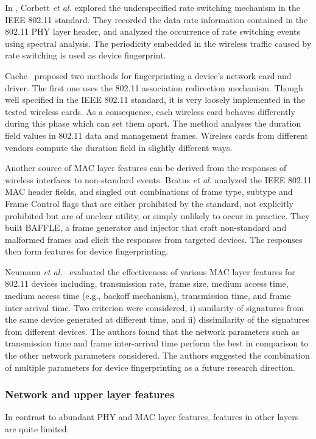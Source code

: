 \documentclass[journal,draftcls,onecolumn,11pt]{IEEEtran}
\newcounter{ctr}\setcounter{ctr}{0}
\begin{document}
In \cite{Corbett2008}, Corbett {\it et al.} explored the underspecified rate switching mechanism in the IEEE 802.11 standard. They recorded the data rate information contained in the 802.11 PHY layer header, and analyzed the occurrence of rate switching events using spectral analysis. The periodicity embedded in the wireless traffic caused by rate switching is used as device fingerprint.

Cache~\cite{Cache} proposed two methods for fingerprinting a device’s network card and driver. The first one uses the 802.11 association redirection mechanism.  Though well specified in the IEEE 802.11 standard, it is very loosely implemented in the tested wireless cards. As a consequence, each wireless card behaves differently during this phase which can set them apart.  The method analyses the duration field values in 802.11 data and management frames.  Wireless cards from different vendors compute the duration field in slightly different ways.

Another source of MAC layer features can be derived from the responses of wireless interfaces to non-standard events. Bratus {\it et al.}\cite{Bratus2008} analyzed the IEEE 802.11 MAC header fields, and singled out combinations of frame type, subtype and Frame Control flags that are either prohibited by the standard, not explicitly prohibited but are of unclear utility, or simply unlikely to occur in practice. They built BAFFLE, a frame generator and injector that craft non-standard and malformed frames and elicit the responses from targeted devices. The responses then form features for device fingerprinting.

Neumann {\it et al.}~\cite{Neumann} evaluated the effectiveness of various MAC layer features for 802.11 devices including, transmission rate, frame size, medium access time, medium access time (e.g., backoff mechanism), transmission time, and frame inter-arrival time. Two criterion were considered, i) similarity of signatures from the same device generated at different time, and ii) dissimilarity of the signatures from different devices. The authors found that the network parameters such as transmission time and frame inter-arrival time perform the best in comparison to the other network parameters considered. The authors suggested the combination of multiple parameters for device fingerprinting as a future research direction.

\subsubsection{Network and upper layer features}
In contrast to abundant PHY and MAC layer features, features in other
layers are quite limited.
\end{document}

